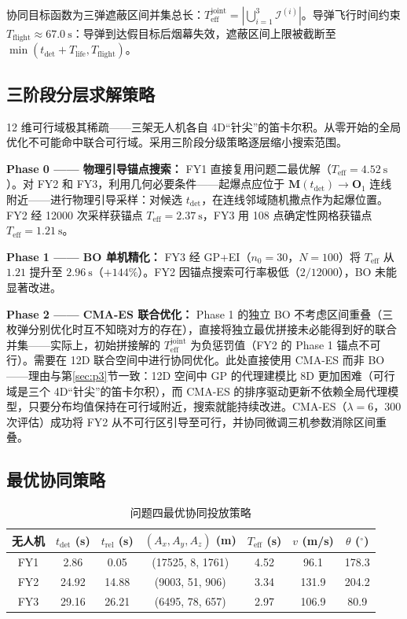 \documentclass{ctexart}
\begin{document}
协同目标函数为三弹遮蔽区间并集总长：$T_{\text{eff}}^{\text{joint}} = |\bigcup_{i=1}^3 \mathcal{I}^{(i)}|$。导弹飞行时间约束 $T_{\text{flight}} \approx 67.0\ \mathrm{s}$：导弹到达假目标后烟幕失效，遮蔽区间上限被截断至 $\min(t_{\text{det}}+T_{\text{life}}, T_{\text{flight}})$。

\subsection{三阶段分层求解策略}

12 维可行域极其稀疏——三架无人机各自 4D``针尖''的笛卡尔积。从零开始的全局优化不可能命中联合可行域。采用三阶段分级策略逐层缩小搜索范围。

\textbf{Phase 0 —— 物理引导锚点搜索：} FY1 直接复用问题二最优解（$T_{\text{eff}}=4.52\ \mathrm{s}$）。对 FY2 和 FY3，利用几何必要条件——起爆点应位于 $\mathbf{M}(t_{\text{det}})\to\mathbf{O}_1$ 连线附近——进行物理引导采样：对候选 $t_{\text{det}}$，在连线邻域随机撒点作为起爆位置。FY2 经 12000 次采样获锚点 $T_{\text{eff}}=2.37\ \mathrm{s}$，FY3 用 108 点确定性网格获锚点 $T_{\text{eff}}=1.21\ \mathrm{s}$。

\textbf{Phase 1 —— BO 单机精化：} FY3 经 GP+EI（$n_0=30$，$N=100$）将 $T_{\text{eff}}$ 从 $1.21$ 提升至 $2.96\ \mathrm{s}$（$+144\%$）。FY2 因锚点搜索可行率极低（$2/12000$），BO 未能显著改进。

\textbf{Phase 2 —— CMA-ES 联合优化：} Phase 1 的独立 BO 不考虑区间重叠（三枚弹分别优化时互不知晓对方的存在），直接将独立最优拼接未必能得到好的联合并集——实际上，初始拼接解的 $T_{\text{eff}}^{\text{joint}}$ 为负惩罚值（FY2 的 Phase 1 锚点不可行）。需要在 12D 联合空间中进行协同优化。此处直接使用 CMA-ES 而非 BO——理由与第\ref{sec:p3}节一致：12D 空间中 GP 的代理建模比 8D 更加困难（可行域是三个 4D``针尖''的笛卡尔积），而 CMA-ES 的排序驱动更新不依赖全局代理模型，只要分布均值保持在可行域附近，搜索就能持续改进。CMA-ES（$\lambda=6$，300 次评估）成功将 FY2 从不可行区引导至可行，并协同微调三机参数消除区间重叠。

\subsection{最优协同策略}

\begin{table}[H]
\centering
\caption{问题四最优协同投放策略}
\label{tab:p4-strategy}
\begin{tabular}{c|c|c|c|c|c|c}
\toprule
\textbf{无人机} & $t_{\text{det}}$ (s) & $t_{\text{rel}}$ (s) & $(A_x, A_y, A_z)$ (m) & $T_{\text{eff}}$ (s) & $v$ (m/s) & $\theta$ ($^\circ$) \\
\midrule
FY1 & 2.86 & 0.05  & (17525, 8, 1761) & 4.52 & 96.1  & 178.3 \\
FY2 & 24.92 & 14.88 & (9003, 51, 906)  & 3.34 & 131.9 & 204.2 \\
FY3 & 29.16 & 26.21 & (6495, 78, 657)  & 2.97 & 106.9 & 80.9 \\
\bottomrule
\end{tabular}
\end{table}
\end{document}
